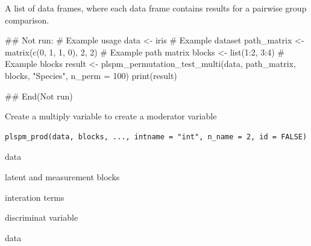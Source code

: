 \documentclass[a4paper]{book}
\begin{document}
%
\begin{Value}
A list of data frames, where each data frame contains results for a pairwise group comparison.
\end{Value}
%
\begin{Examples}
\begin{ExampleCode}
## Not run: 
# Example usage
data <- iris  # Example dataset
path_matrix <- matrix(c(0, 1, 1, 0), 2, 2)  # Example path matrix
blocks <- list(1:2, 3:4)  # Example blocks
result <- plspm_permutation_test_multi(data, path_matrix, blocks, "Species", n_perm = 100)
print(result)

## End(Not run)
\end{ExampleCode}
\end{Examples}
%
\begin{Description}
Create a multiply variable to create a moderator variable
\end{Description}
%
\begin{Usage}
\begin{verbatim}
plspm_prod(data, blocks, ..., intname = "int", n_name = 2, id = FALSE)
\end{verbatim}
\end{Usage}
%
\begin{Arguments}
\begin{ldescription}
\item[\code{data}] data

\item[\code{blocks}] latent and measurement blocks

\item[\code{...}] interation terms

\item[\code{id}] discriminat variable
\end{ldescription}
\end{Arguments}
%
\begin{Value}
data
\end{Value}
%
\end{document}

